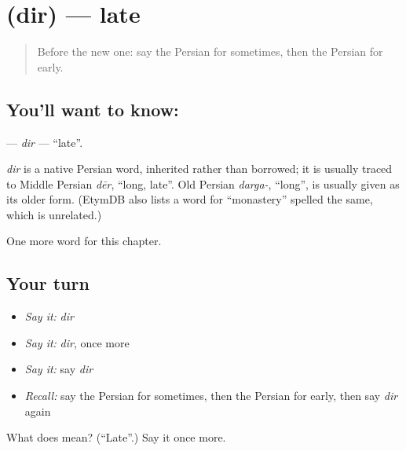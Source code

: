 \section[\texorpdfstring{\fa{دیر} (dir)}{دیر (dir)}]{ (dir) — late}

\label{lesson:FA-C66-dir}



\begin{quote}
Before the new one: say the Persian for sometimes, then the Persian for early.
\end{quote}

\subsection*{You'll want to know: }
\textbf{} — \emph{dir} — \textquotedblleft{}late\textquotedblright{}.

\begin{cousinweb}
\emph{dir} is a native Persian word, inherited rather than borrowed; it is usually traced to Middle Persian \emph{dēr}, \textquotedblleft{}long, late\textquotedblright{}. Old Persian \emph{darga-}, \textquotedblleft{}long\textquotedblright{}, is usually given as its older form. (EtymDB also lists a word for \textquotedblleft{}monastery\textquotedblright{} spelled the same, which is unrelated.)
\end{cousinweb}

\begin{grammarlens}[title={What you've built}]
One more word for this chapter.
\end{grammarlens}

\subsection*{Your turn}
\begin{itemize}
\raggedright
  \item \emph{Say it:} \emph{dir}
  \item \emph{Say it:} \emph{dir}, once more
  \item \emph{Say it:} say \emph{dir}
  \item \emph{Recall:} say the Persian for sometimes, then the Persian for early, then say \emph{dir} again
\end{itemize}

\begin{tcolorbox}[breakable,colback=teal!4,colframe=teal!35!black,title={Before you move on}]
What does  mean? (\textquotedblleft{}Late\textquotedblright{}.) Say it once more.
\end{tcolorbox}

